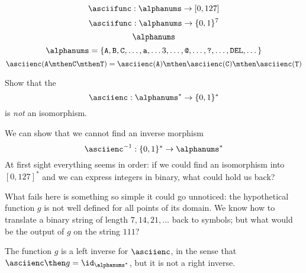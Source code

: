 \begin{forslides}
\begin{equation} \label{eq:ASCII-fun}
\asciifunc: \alphanums \to [0, 127]
\end{equation}
\begin{equation} \label{eq:ASCII-to-digits}
\asciifunc: \alphanums \to \{0,1\}^7
\end{equation}
\begin{equation}  \label{eq:alphanums}
\alphanums
\end{equation}
\begin{equation}  \label{eq:alphanums_list}
\alphanums = \{ \texttt{A}, \texttt{B}, \texttt{C}, \dots, \texttt{a}, \dots 3, \dots,  \texttt{@}, \dots, \texttt{?}, \dots, \texttt{DEL}, \dots \}
\end{equation}
\begin{equation} \label{eq:alphanums_list_comp}
 \asciienc( \texttt{A} \mthen  \texttt{C} \mthen \texttt{T})
  =\asciienc(\texttt{A}) \mthen   \asciienc(\texttt{C}) \mthen \asciienc(\texttt{T})
\end{equation}
\end{forslides}
\begin{exercise}
Show that the \whomo
\begin{equation}\label{eq:ascii-to-bin}
\asciienc: \alphanums^* \to \{0,1\}^*
 \end{equation}
 is \emph{not} an isomorphism.
\end{exercise}
\begin{solution}
We can show that we cannot find an inverse morphism
 \begin{equation}\label{eq:bin-to-ascii}
 \asciienc^{-1}:  \{0,1\}^* \to \alphanums^*
 \end{equation}
 At first sight everything seems in order: if we could find an isomorphism into $[0,127]^*$ and
 we can express integers in binary, what could hold us back?

What fails here is something so simple it could go unnoticed: the hypothetical function $g$ is not well defined for all points of its domain. We know how to translate a binary string of length $7,14,21,\dots$ back to symbols; but what would be the output of $g$ on the string $111$?

The function $g$ is a left inverse for $\asciienc$, in the sense that
$\asciienc\then g = \id_{\alphanums^*}$, but it is not a right inverse.

\end{solution}

